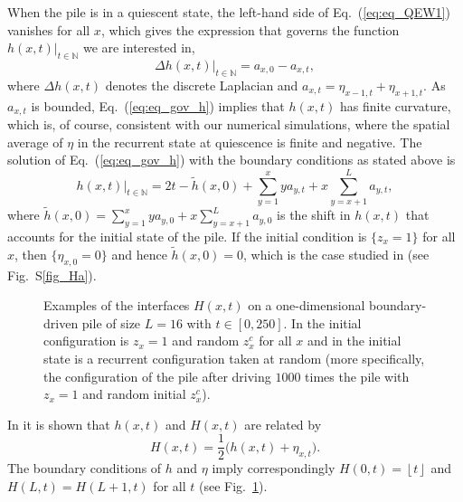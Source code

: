 \documentclass[doublecol]{epl2}
\newcommand{\elabel}[1]{\label{eq:#1}}
\newcommand{\Eref}[1]{Eq.~(\ref{eq:#1})}
\newcommand{\Figref}[1]{Fig.~\ref{fig_#1}}
\begin{document}
When the pile is in a quiescent state, the left-hand side of \Eref{eq_QEW1} vanishes for all $x$, which gives the expression that governs the function $h(x,t)|_{t\in\mathbb{N}}$ we are interested in,
\begin{equation}
\Delta h(x,t)|_{t\in\mathbb{N}} = a_{x,0}- a_{x,t},
\elabel{eq_gov_h}
\end{equation}
where $\Delta h(x,t)$ denotes the discrete Laplacian and $a_{x,t} = \eta_
{x-1,t}+\eta_{x+1,t}$. As $a_{x,t}$ is bounded, \Eref{eq_gov_h} implies that
$h(x,t)$ has finite curvature, which is, of course, consistent with our numerical
simulations, where the spatial average of $\eta$ in the recurrent state at quiescence is finite and negative.
 The solution of \Eref{eq_gov_h} with the boundary conditions as stated above is
 \begin{equation}
 {h}(x,t)|_{t\in\mathbb{N}} = 2 {t}  - \tilde{h}(x,0) +  \sum_{y=1}^x y a_{y,t} + x \sum_{y=x+1}^La_{y,t},
 \elabel{eq_sol_ht1}
 \end{equation}
  where $ \tilde{h}(x,0) =  \sum_{y=1}^x y a_{y,0} + x \sum_{y=x+1}^La_{y,0}$ is the shift in $h(x,t)$ that accounts for the initial state of the pile. If the initial condition is $\{z_x=1\}$ for all $x$, then $\{\eta_{x,0}=0\}$ and hence $\tilde{h}(x,0) =0$, which is the case studied in \cite{pruessner2003oslo} (see Fig.~S\ref{fig_Ha}).

 \begin{figure}
 \centering
{}
\caption{ \label{fig_H} Examples of the interfaces $H(x,t)$ on a one-dimensional boundary-driven pile of size $L=16$ with $t\in[0,250]$. In  the initial configuration is $z_x=1$ and random $z_x^c$ for all $x$ and in  the initial state is a recurrent configuration taken at random (more specifically, the configuration of the pile after driving $1000$ times the pile with  $z_x=1$ and random initial $z_x^c$).}
\end{figure}

In \cite{pruessner2003oslo} it is shown that $h(x,t)$ and $H(x,t)$ are related by
\begin{equation}
H(x,t)=\frac{1}{2}\big(h(x,t)+\eta_{x,t}\big).
\elabel{eq_Hh}
\end{equation}
The boundary conditions of $h$ and $\eta$ imply correspondingly $H(0,t)=\left\lfloor {t} \right\rfloor$ and $H(L,t)=H(L+1,t)$ for all $t$ \cite{PhysRevLett.77.111} (see \Figref{H}). 
\end{document}
